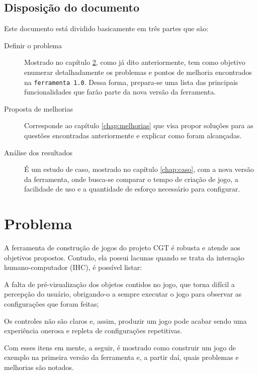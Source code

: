 \documentclass[12pt,twoside,openright,a4paper,english,brazil,sumario=tradicional]{abntex2}
\begin{document}
\section{Disposição do documento}
Este documento está dividido basicamente em três partes que são:
\begin{description}
	\item[Definir o problema] Mostrado no capítulo \ref{chap:problemas}, como já dito anteriormente, tem como objetivo enumerar detalhadamente os problemas e pontos de melhoria encontrados na \texttt{ferramenta 1.0}. Dessa forma, prepara-se uma lista das principais funcionalidades que farão parte da nova versão da ferramenta.
	\item[Proposta de melhorias] Corresponde ao capítulo \ref{chap:melhorias} que visa propor soluções para as questões encontradas anteriormente e explicar como foram alcançadas.
	\item[Análise dos resultados] É um estudo de caso, mostrado no capítulo \ref{chap:caso}, com a nova versão da ferramenta, onde busca-se comparar o tempo de criação de jogo, a facilidade de uso e a quantidade de esforço necessário para configurar.
\end{description}

\chapter{Problema}
\label{chap:problemas}
A ferramenta de construção de jogos do projeto CGT é robusta e atende aos objetivos propostos. Contudo, ela possui lacunas quando se trata da interação humano-computador (IHC), é possível listar:

\begin{alineas}
	\item A falta de pré-vizualização dos objetos contidos no jogo, que torna difícil a percepção do usuário, obrigando-o a sempre executar o jogo para observar as configurações que foram feitas;
	\item Os controles não são claros e, assim, produzir um jogo pode acabar sendo uma experiência onerosa e repleta de configurações repetitivas.
\end{alineas}

Com esses itens em mente, a seguir, é mostrado como construir um jogo de exemplo na primeira versão da ferramenta e, a partir daí, quais problemas e melhorias são notados.
\end{document}
